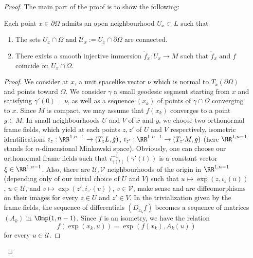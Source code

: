 \begin{proof}
The main part of the proof is to show the following:

\begin{lemm}\label{lem.extension.locale}
Each point $x \in \partial \Omega$ admits an open neighbourhood $U_x \subset L$ such that
\begin{enumerate}
\item \label{5.9.1}The sets $U_x \cap \Omega$ and ${\mathcal U}_x:=U_x \cap \partial \Omega$ are connected.
\item \label{5.9.2}There exists a smooth injective immersion $\tilde{f}_x: U_x \to M$ such that $\tilde{f}_x$ and $f$ coincide on $U_x \cap \Omega$.
\end{enumerate}
\end{lemm}

\begin{proof}
We consider at $x$, a unit spacelike vector $\nu$ which is normal to $T_x(\partial \Omega)$ and points toward $\Omega$. We consider $\gamma$ a small geodesic segment starting from $x$ and satisfying $\gamma'(0)=\nu$, as well as a sequence $(x_k)$ of points of $\gamma \cap \Omega$ converging to $x$. Since $M$ is compact, we may assume that $f(x_k)$ converges to a point $y \in M$. In small neighbourhoods $U$ and $V$ of $x$ and $y$, we choose two orthonormal frame fields, which yield at each points $z,z'$ of $U$ and $V$ respectively, isometric identifications $i_z: \RR^{1,n-1} \to (T_zL,\tilde{g})$, $i_{z'}:\RR^{1,n-1} \to (T_{z'}M,g)$ (here $\RR^{1,n-1}$ stands for $n$-dimensional Minkowski space). Obviously, one can choose our orthonormal frame fields such that $i_{\gamma(t)}^{-1}(\gamma'(t))$ is a constant vector $\xi \in \RR^{1,n-1}$. Also, there are ${\mathcal U}, {\mathcal V}$ neighbourhoods of the origin in $\RR^{1,n-1}$ (depending only of our initial choice of $U$ and $V$) such that $u \mapsto \exp(z,i_z(u))$, $u \in {\mathcal U}$, and $v \mapsto \exp(z',i_{z'}(v))$, $v \in {\mathcal V}$, make sense and are diffeomorphisms on their images for every $z \in U$ and $z' \in V$. In the trivialization given by the frame fields, the sequence of differentials $(D_{x_k}f)$ becomes a sequence of matrices $(A_k)$ in $\Omp(1,n-1)$. Since $f$ is an isometry, we have the relation
\begin{equation}\label{eq.exponentielle}
f(\exp(x_k,u))=\exp(f(x_k),A_k(u))
\end{equation}
for every $u \in {\mathcal U}$.


\end{proof}
\end{proof}
